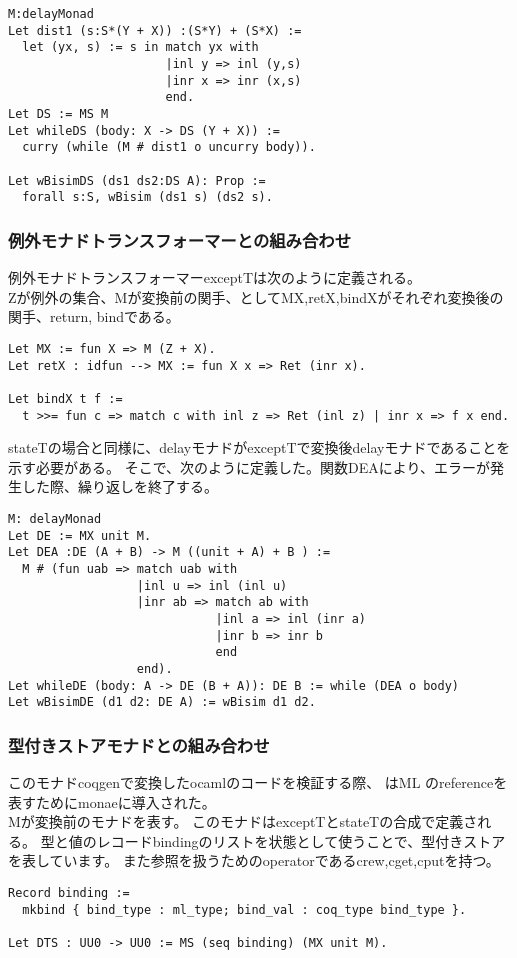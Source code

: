 \documentclass[japanese]{jssst_ppl}
\theoremstyle{definition}
\begin{document}
\begin{verbatim}
M:delayMonad
Let dist1 (s:S*(Y + X)) :(S*Y) + (S*X) :=
  let (yx, s) := s in match yx with
                      |inl y => inl (y,s)
                      |inr x => inr (x,s)
                      end.
Let DS := MS M
Let whileDS (body: X -> DS (Y + X)) :=
  curry (while (M # dist1 o uncurry body)).

Let wBisimDS (ds1 ds2:DS A): Prop :=
  forall s:S, wBisim (ds1 s) (ds2 s).
          \end{verbatim}




\subsubsection{例外モナドトランスフォーマーとの組み合わせ}
例外モナドトランスフォーマーexceptTは次のように定義される。\\
Zが例外の集合、Mが変換前の関手、としてMX,retX,bindXがそれぞれ変換後の関手、return, bindである。

\begin{verbatim}
Let MX := fun X => M (Z + X).
Let retX : idfun --> MX := fun X x => Ret (inr x).

Let bindX t f :=
  t >>= fun c => match c with inl z => Ret (inl z) | inr x => f x end.
        \end{verbatim}
stateTの場合と同様に、delayモナドがexceptTで変換後delayモナドであることを示す必要がある。
そこで、次のように定義した。関数DEAにより、エラーが発生した際、繰り返しを終了する。

\begin{verbatim}
M: delayMonad
Let DE := MX unit M.
Let DEA :DE (A + B) -> M ((unit + A) + B ) :=
  M # (fun uab => match uab with
                  |inl u => inl (inl u)
                  |inr ab => match ab with
                             |inl a => inl (inr a)
                             |inr b => inr b
                             end
                  end).
Let whileDE (body: A -> DE (B + A)): DE B := while (DEA o body)
Let wBisimDE (d1 d2: DE A) := wBisim d1 d2.
        \end{verbatim}

\subsubsection{型付きストアモナドとの組み合わせ}
このモナドcoqgenで変換したocamlのコードを検証する際、
はML のreferenceを表すためにmonaeに導入された。\\
Mが変換前のモナドを表す。
このモナドはexceptTとstateTの合成で定義される。
型と値のレコードbindingのリストを状態として使うことで、型付きストアを表しています。
また参照を扱うためのoperatorであるcrew,cget,cputを持つ。
\begin{verbatim}
Record binding :=
  mkbind { bind_type : ml_type; bind_val : coq_type bind_type }.

Let DTS : UU0 -> UU0 := MS (seq binding) (MX unit M).
        \end{verbatim}
\end{document}
